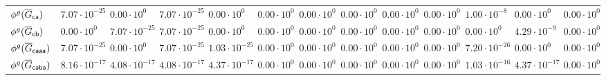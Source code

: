 \begin{table}[!t]
{\begin{tabular}{lllllllllllll}
		${\phi^{g}}(\overline{G}_{\mathsf{ca}})$   & $7.07\cdot 10^{-25}$ & $0.00\cdot 10^{0}$   & $7.07\cdot 10^{-25}$ & $0.00\cdot 10^{0}$   & $0.00\cdot 10^{0}$& $0.00\cdot 10^{0}$& $0.00\cdot 10^{0}$& $0.00\cdot 10^{0}$& $0.00\cdot 10^{0}$    &$1.00\cdot 10^{-8}$& $0.00\cdot 10^{0}$& $0.00\cdot 10^{0}$ \\
		${\phi^{g}}(\overline{G}_{\mathsf{cb}})$   & $0.00\cdot 10^{0}$   & $7.07\cdot 10^{-25}$ & $7.07\cdot 10^{-25}$ & $0.00\cdot 10^{0}$   & $0.00\cdot 10^{0}$& $0.00\cdot 10^{0}$& $0.00\cdot 10^{0}$& $0.00\cdot 10^{0}$& $0.00\cdot 10^{0}$    &$0.00\cdot 10^{0}$ & $4.29\cdot 10^{-9}$& $0.00\cdot 10^{0}$ \\
		${\phi^{g}}(\overline{G}_{\mathsf{caaa}})$ & $7.07\cdot 10^{-25}$ & $0.00\cdot 10^{0}$   & $7.07\cdot 10^{-25}$ & $1.03\cdot 10^{-25}$ & $0.00\cdot 10^{0}$& $0.00\cdot 10^{0}$& $0.00\cdot 10^{0}$& $0.00\cdot 10^{0}$& $0.00\cdot 10^{0}$    &$7.20\cdot 10^{-26}$ & $0.00\cdot 10^{0}$& $0.00\cdot 10^{0}$ \\
		\bottomrule
				${\phi^{g}}(\overline{G}_{\mathsf{caba}})$ & $8.16\cdot10^{-17}$ & $4.08\cdot 10^{-17}$ & $4.08\cdot10^{-17}$ & $4.37\cdot 10^{-17}$ &  $0.00\cdot 10^{0}$& $0.00\cdot 10^{0}$& $0.00\cdot 10^{0}$ & $0.00\cdot 10^{0}$ & $0.00\cdot 10^{0}$    & $1.03\cdot10^{-16}$ & $4.37\cdot10^{-17}$& $0.00\cdot 10^{0}$ \\
		\bottomrule
	\end{tabular}}

\end{table}
